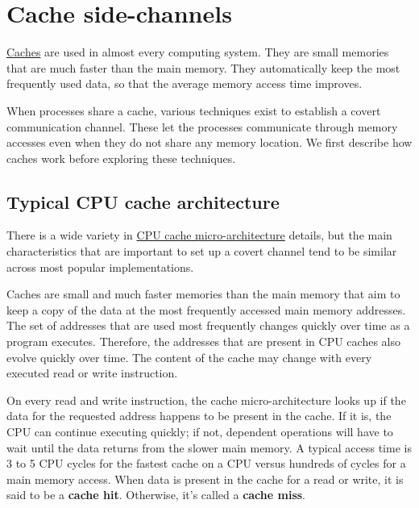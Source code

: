 \documentclass[
  a4paper,
]{report}
\begin{document}
\section{Cache side-channels}\label{cache-side-channels}

\href{https://en.wikipedia.org/wiki/Cache_(computing)}{Caches}
are used in almost every computing system. They are small memories that
are much faster than the main memory. They automatically keep the most
frequently used data, so that the average memory access time improves.

When processes share a cache, various techniques exist to establish a
covert communication channel. These let the processes communicate
through memory accesses even when they do not share any memory location.
We first describe how caches work before exploring these techniques.

\subsection{Typical CPU cache
architecture}\label{typical-cpu-cache-architecture}

There is a wide variety in
\href{https://en.wikipedia.org/wiki/CPU_cache}{CPU cache
micro-architecture} details, but the main characteristics that are
important to set up a covert channel tend to be similar across most
popular implementations.

Caches are small and much faster memories than the main memory that aim
to keep a copy of the data at the most frequently accessed main memory
addresses. The set of addresses that are used most frequently changes
quickly over time as a program executes. Therefore, the addresses that
are present in CPU caches also evolve quickly over time. The content of
the cache may change with every executed read or write instruction.

On every read and write instruction, the cache micro-architecture looks
up if the data for the requested address happens to be present in the
cache. If it is, the CPU can continue executing quickly; if not,
dependent operations will have to wait until the data returns from the
slower main memory. A typical access time is 3 to 5 CPU cycles for the
fastest cache on a CPU versus hundreds of cycles for a main memory
access. When data is present in the cache for
a read or write, it is said to be a \textbf{cache hit}. Otherwise, it's called a \textbf{cache miss}.
\end{document}
